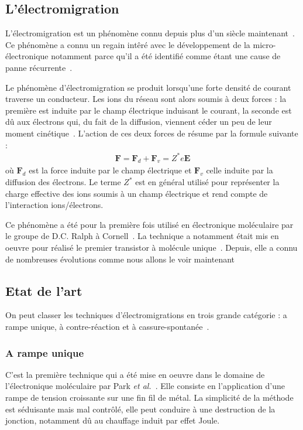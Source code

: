 \subsection{L'électromigration}
L'électromigration est un phénomène connu depuis plus d'un siècle maintenant~\cite{Gerardin1861}. Ce phénomène a connu un regain int\^eré avec le développement de la micro-électronique notamment parce qu'il a été identifié comme étant une cause de panne récurrente~\cite{Blech1967,Black1969}.

Le phénomène d'électromigration se produit lorsqu'une forte densité de courant traverse un conducteur. Les ions du réseau sont alors soumis à deux forces : la première est induite par le champ électrique induisant le courant, la seconde est d\^u aux électrons qui, du fait de la diffusion, viennent céder un peu de leur moment cinétique~\cite{Ho1989}. L'action de ces deux forces de résume par la formule suivante :
\begin{eqnarray}
\textbf{F} = \textbf{F}_d + \textbf{F}_v = Z^*e\textbf{E} \nonumber
\end{eqnarray}
où $\textbf{F}_d$ est la force induite par le champ électrique et $\textbf{F}_v$ celle induite par la diffusion des électrons. Le terme $Z^*$ est en général utilisé pour représenter la charge effective des ions soumis à un champ électrique et rend compte de l'interaction ions/électrons.

Ce phénomène a été pour la première fois utilisé en électronique moléculaire par le groupe de D.C. Ralph à Cornell~\cite{Park1999}. La technique a notamment était mis en oeuvre pour réalisé le premier transistor à molécule unique~\cite{Park2000}. Depuis, elle a connu de nombreuses évolutions comme nous allons le voir maintenant

\subsection{Etat de l'art}
On peut classer les techniques d'électromigrations en trois grande catégorie : a rampe unique, à contre-réaction et à cassure-spontanée~\cite{Girod2012}.

\subsubsection{A rampe unique}
C'est la première technique qui a été mise en oeuvre dans le domaine de l'électronique moléculaire par Park \textit{et al.}~\cite{Park1999}. Elle consiste en l'application d'une rampe de tension croissante sur une fin fil de métal. La simplicité de la méthode est séduisante mais mal contrôlé, elle peut conduire à une destruction de la jonction, notamment dû au chauffage induit par effet Joule.

